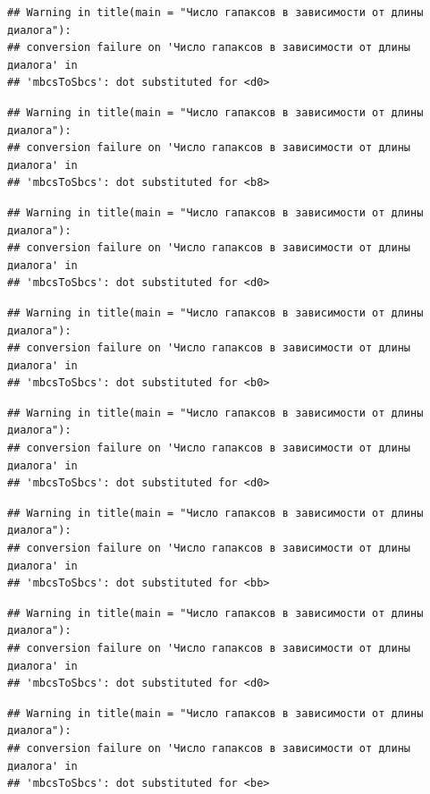 \documentclass[
]{book}
\theoremstyle{definition}
\theoremstyle{definition}
\theoremstyle{definition}
\theoremstyle{definition}
\theoremstyle{remark}
\begin{document}
\begin{verbatim}
## Warning in title(main = "Число гапаксов в зависимости от длины диалога"):
## conversion failure on 'Число гапаксов в зависимости от длины диалога' in
## 'mbcsToSbcs': dot substituted for <d0>
\end{verbatim}

\begin{verbatim}
## Warning in title(main = "Число гапаксов в зависимости от длины диалога"):
## conversion failure on 'Число гапаксов в зависимости от длины диалога' in
## 'mbcsToSbcs': dot substituted for <b8>
\end{verbatim}

\begin{verbatim}
## Warning in title(main = "Число гапаксов в зависимости от длины диалога"):
## conversion failure on 'Число гапаксов в зависимости от длины диалога' in
## 'mbcsToSbcs': dot substituted for <d0>
\end{verbatim}

\begin{verbatim}
## Warning in title(main = "Число гапаксов в зависимости от длины диалога"):
## conversion failure on 'Число гапаксов в зависимости от длины диалога' in
## 'mbcsToSbcs': dot substituted for <b0>
\end{verbatim}

\begin{verbatim}
## Warning in title(main = "Число гапаксов в зависимости от длины диалога"):
## conversion failure on 'Число гапаксов в зависимости от длины диалога' in
## 'mbcsToSbcs': dot substituted for <d0>
\end{verbatim}

\begin{verbatim}
## Warning in title(main = "Число гапаксов в зависимости от длины диалога"):
## conversion failure on 'Число гапаксов в зависимости от длины диалога' in
## 'mbcsToSbcs': dot substituted for <bb>
\end{verbatim}

\begin{verbatim}
## Warning in title(main = "Число гапаксов в зависимости от длины диалога"):
## conversion failure on 'Число гапаксов в зависимости от длины диалога' in
## 'mbcsToSbcs': dot substituted for <d0>
\end{verbatim}

\begin{verbatim}
## Warning in title(main = "Число гапаксов в зависимости от длины диалога"):
## conversion failure on 'Число гапаксов в зависимости от длины диалога' in
## 'mbcsToSbcs': dot substituted for <be>
\end{verbatim}
\end{document}
